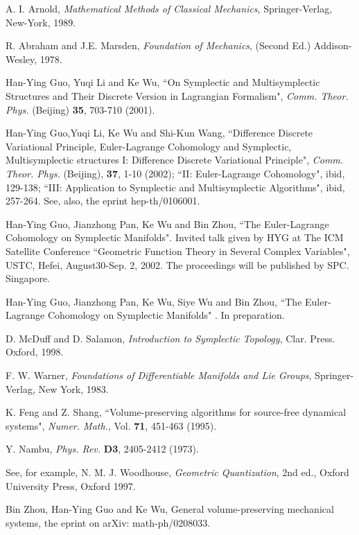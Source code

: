 \documentclass[12pt,a4paper]{article}
\begin{document}
\begin{thebibliography}{99}

A. I. Arnold, \textit{Mathematical Methods of Classical
  Mechanics}, Springer-Verlag, New-York, 1989.

 R. Abraham and J.E. Marsden,
  \textit{Foundation of Mechanics}, (Second Ed.) Addison-Wesley, 1978.

Han-Ying Guo, Yuqi Li and Ke Wu, ``On Symplectic and
  Multisymplectic Structures and Their Discrete Version in Lagrangian
  Formalism", \textit{Comm. Theor. Phys.} (Beijing) \textbf{35}, 703-710 (2001).



Han-Ying Guo,Yuqi Li, Ke Wu and Shi-Kun Wang, ``Difference
  Discrete Variational Principle, Euler-Lagrange Cohomology and Symplectic,
  Multisymplectic structures I: Difference Discrete Variational Principle",
  \textit{Comm. Theor. Phys.} (Beijing), \textbf{37},  1-10 (2002);
  ``II: Euler-Lagrange Cohomology", ibid, 129-138;
  ``III: Application to Symplectic and Multisymplectic Algorithms", ibid,
  257-264. See, also, the eprint hep-th/0106001.

 Han-Ying Guo, Jianzhong Pan, Ke Wu and
 Bin Zhou, ``The Euler-Lagrange Cohomology  on Symplectic
 Manifolds". Invited talk given by HYG at The ICM Satellite Conference
 ``Geometric Function Theory in Several Complex Variables", USTC, Hefei,
 August30-Sep. 2, 2002. The proceedings will be published by SPC. Singapore.

 Han-Ying Guo, Jianzhong Pan, Ke Wu, Siye Wu and
 Bin Zhou, ``The Euler-Lagrange Cohomology  on Symplectic
 Manifolds" . In preparation.

D. McDuff and D. Salamon,
\textit{Introduction to Symplectic Topology}, Clar. Press. Oxford,
1998.

F. W. Warner, \textit{Foundations of
Differentiable Manifolds
  and Lie Groups}, Springer-Verlag, New York, 1983.

K. Feng and Z. Shang, ``Volume-preserving algorithms for
  source-free dynamical systems", \textit{Numer. Math.}, Vol. \textbf{71},
   451-463 (1995).

Y. Nambu, \textit{Phys. Rev.} \textbf{D3},  2405-2412 (1973).

See, for example, N. M. J. Woodhouse,
\textit{Geometric
  Quantization}, 2nd ed., Oxford University Press, Oxford 1997.

Bin Zhou, Han-Ying Guo and Ke Wu,
General volume-preserving mechanical
 systems, the eprint on arXiv: math-ph/0208033.

\end{thebibliography}
\end{document}
